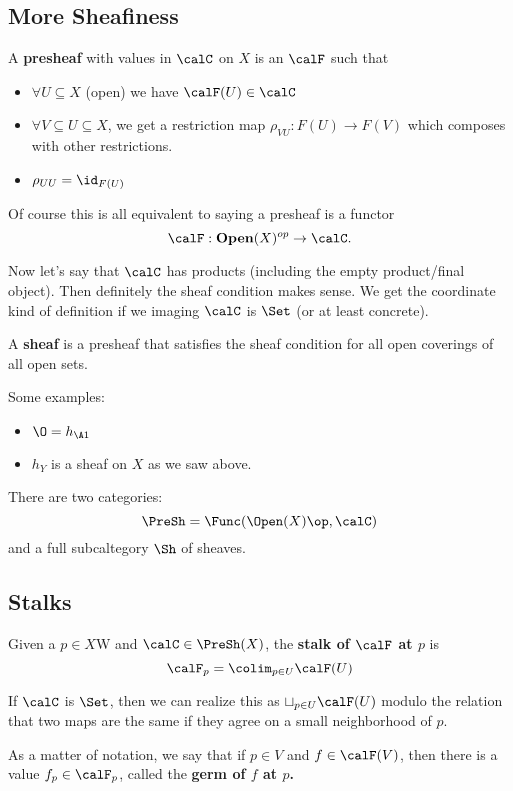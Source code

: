 \documentclass[12pt]{article}
\begin{document}
\subsection{More Sheafiness}
\begin{defn}
	A \textbf{presheaf} with values in $\calC$ on $X$ is an $\calF$ such that 
	\begin{itemize}
		\item $\forall U\subseteq X$ (open) we have $\calF(U)\in\calC$
		\item $\forall V\subseteq U\subseteq X$, we get a restriction map $\rho_{VU}:F(U)\to F(V)$ which composes with other restrictions.
		\item $\rho_{UU}=\id_{F(U)}$
	\end{itemize}
\end{defn}
\begin{rmk}
	Of course this is all equivalent to saying a presheaf is a functor 
	\[\calF:\mathbf{Open}(X)^{op}\to \calC.\]
\end{rmk}

Now let's say that $\calC$ has products (including the empty product/final object). Then definitely the sheaf condition makes sense. 
We get the coordinate kind of definition if we imaging $\calC$ is $\Set$ (or at least concrete).
\begin{defn}
	A \textbf{sheaf} is a presheaf that satisfies the sheaf condition for all open coverings of all open sets.
\end{defn}
Some examples:
\begin{itemize}
	\item $\O=h_{\A1}$
	\item $h_Y$ is a sheaf on $X$ as we saw above.
\end{itemize}
\begin{rmk}
	There are two categories:
	\[\PreSh=\Func(\Open(X)\op,\calC)\]
	and a full subcaltegory $\Sh$ of sheaves.
\end{rmk}
\subsection{Stalks}
\begin{defn}
	Given a $p\in X$W and $\calC\in \PreSh(X)$, the \textbf{stalk of $\calF$ at $p$} is
	\[\calF_p=\colim_{p\in U}\calF(U)\]
\end{defn}
\begin{rmk}
	If $\calC$ is $\Set$, then we can realize this as $\sqcup_{p\in U}\calF(U)$ modulo the relation that two maps are the same
	if they agree on a small neighborhood of $p$.
\end{rmk}
As a matter of notation, we say that if $p\in V$ and $f\in\calF(V)$, then there is a value $f_p\in \calF_p$,
called the \textbf{germ of $f$ at $p$.}
\end{document}

